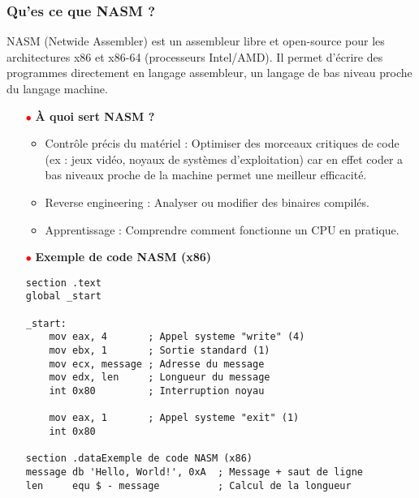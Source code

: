 \documentclass{article}
\begin{document}
\subsubsection*{Qu'es ce que NASM ?}
\begin{figure}[h]
    \label{fig:nasm}
\end{figure}
NASM (Netwide Assembler) est un assembleur libre et open-source pour les architectures x86 et x86-64 (processeurs Intel/AMD). Il permet d'écrire des programmes directement en langage assembleur, un langage de bas niveau proche du langage machine. \\
\begin{itemize}
    \item[\textbf{\textcolor{red}{$\bullet$}}] \textbf{À quoi sert NASM ?}
    \begin{itemize}
        \item Contrôle précis du matériel : Optimiser des morceaux critiques de code (ex : jeux vidéo, noyaux de systèmes d’exploitation) car en effet coder a bas niveaux proche de la machine permet une meilleur efficacité.
        \item Reverse engineering : Analyser ou modifier des binaires compilés.
        \item Apprentissage : Comprendre comment fonctionne un CPU en pratique.
    \end{itemize}
    
    \item[\textbf{\textcolor{red}{$\bullet$}}] \textbf{Exemple de code NASM (x86)}
    
\begin{lstlisting}[language=ld]
    section .text
global _start

_start:
    mov eax, 4       ; Appel systeme "write" (4)
    mov ebx, 1       ; Sortie standard (1)
    mov ecx, message ; Adresse du message
    mov edx, len     ; Longueur du message
    int 0x80         ; Interruption noyau

    mov eax, 1       ; Appel systeme "exit" (1)
    int 0x80

section .dataExemple de code NASM (x86)
message db 'Hello, World!', 0xA  ; Message + saut de ligne
len     equ $ - message          ; Calcul de la longueur
    \end{lstlisting}
\end{itemize}
\end{document}
